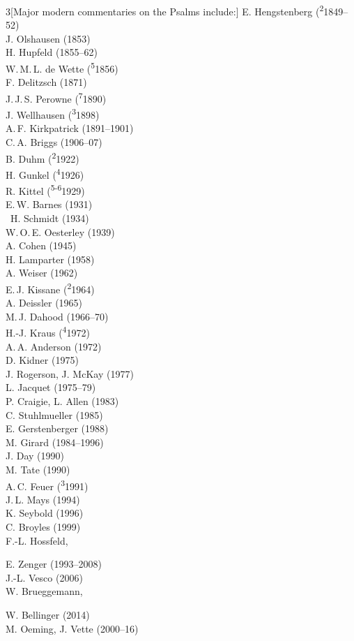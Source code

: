 \documentclass[titlepage]{article}
\begin{document}
\begin{multicols}{3}[Major modern commentaries on the Psalms include:]%
\footnotesize\noindent
E. Hengstenberg (\textsuperscript{2}1849--52)\\
J. Olshausen (1853)\\
H. Hupfeld (1855--62)\\
W.\,M.\,L. de Wette (\textsuperscript{5}1856)\\
F. Delitzsch (1871)\\
J.\,J.\,S. Perowne (\textsuperscript{7}1890)\\
J. Wellhausen (\textsuperscript{3}1898)\\
A.\,F. Kirkpatrick (1891--1901)\\
C.\,A. Briggs (1906--07)\\
B. Duhm (\textsuperscript{2}1922)\\
H. Gunkel (\textsuperscript{4}1926)\\
R. Kittel (\textsuperscript{5-6}1929)\\
E.\,W. Barnes (1931)\\\
H. Schmidt (1934)\\
W.\,O.\,E. Oesterley (1939)\\
A. Cohen (1945)\\
H. Lamparter (1958)\\
A. Weiser (1962)\\
E.\,J. Kissane (\textsuperscript{2}1964)\\
A. Deissler (1965)\\
M.\,J. Dahood (1966--70)\\
H.-J. Kraus (\textsuperscript{4}1972)\\
A.\,A. Anderson (1972)\\
D. Kidner (1975)\\
J. Rogerson, J. McKay (1977)\\
L. Jacquet (1975--79)\\
P. Craigie, L. Allen (1983)\\
C. Stuhlmueller (1985)\\
E. Gerstenberger (1988)\\
M. Girard (1984--1996)\\
J. Day (1990)\\
M. Tate (1990)\\
A.\,C. Feuer (\textsuperscript{3}1991)\\
J.\,L. Mays (1994)\\
K. Seybold (1996)\\
C. Broyles (1999)\\
F.-L. Hossfeld,\par E. Zenger (1993--2008)\\
J.-L. Vesco (2006)\\
W. Brueggemann,\par W. Bellinger (2014)\\
M. Oeming, J. Vette (2000--16)
\end{multicols}
\end{document}
